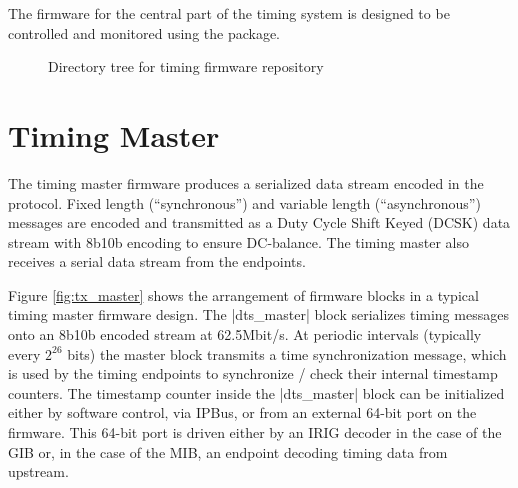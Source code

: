 \documentclass{dune}
\begin{document}
The firmware for the central part of the timing system is designed to be controlled and monitored using the  package.

\begin{figure}[h!]
\renewcommand*\DTstylecomment{\color{blue}}
\renewcommand*\DTstyle{\ttfamily\textcolor{red}}
    \caption{Directory tree for timing firmware repository}
    \label{fig:timingRepoDirectories}
\end{figure}

\section{Timing Master}

The timing master firmware produces a serialized data stream encoded in the    protocol\cite{ref:dts-timing-protocol}. Fixed length (``synchronous'') and variable length (``asynchronous'') messages are encoded and transmitted as a Duty Cycle Shift Keyed (DCSK) data stream with 8b10b encoding to ensure DC-balance. The timing master also receives a serial data stream from the endpoints.


Figure \ref{fig:tx_master} shows the arrangement of firmware blocks in a typical timing master firmware design. The |dts_master| block serializes timing messages onto an 8b10b encoded stream at 62.5Mbit/s. At periodic intervals (typically every $2^{26}$ bits) the master block transmits a time synchronization message, which is used by the timing endpoints to synchronize / check their internal timestamp counters. The timestamp counter inside the |dts_master| block can be initialized either by software control, via IPBus, or from an external 64-bit port on the firmware. This 64-bit port is driven either by an IRIG decoder in the case of the GIB or, in the case of the MIB, an endpoint decoding timing data from upstream.
\end{document}

